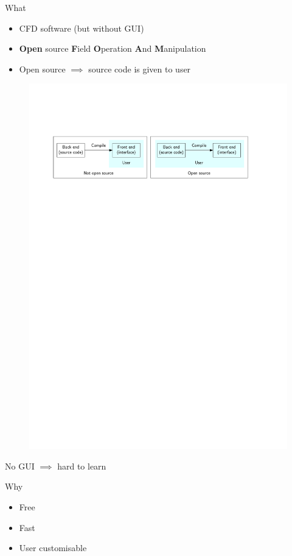 \begin{frame}
    \begin{block}{What}
        \begin{itemize}
            \item CFD software (but without GUI)
            \item \textbf{Open} source \textbf{F}ield \textbf{O}peration \textbf{A}nd \textbf{M}anipulation
            \item Open source $\implies$ source code is given to user
        \end{itemize}
    \end{block}
    \begin{figure}
        \includegraphics[width=\linewidth]{opensource_illustration}
    \end{figure}
    No GUI $\implies$ hard to learn
    \begin{block}{Why}
        \begin{itemize}
            \item Free
            \item Fast
            \item User customisable
        \end{itemize}
    \end{block}
\end{frame}

